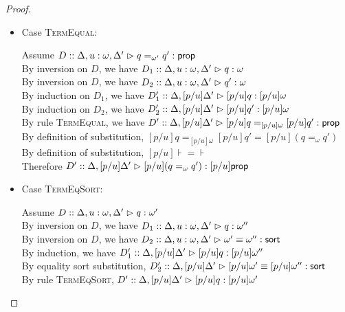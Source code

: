\begin{proof}
\begin{enumerate}
\begin{itemize}
    \item Case \textsc{TermEqual}: 
      \begin{tabbedproof}
        \oo Assume $D :: \judgeA[{\Delta, u:\omega, \Delta'}]{q =_{\omega'} q'}{\assert}$ \\
        \ooo By inversion on $D$, we have 
             $D_1 :: \judgeA[{\Delta, u:\omega, \Delta'}]{q}{\omega}$ \\
        \ooo By inversion on $D$, we have 
             $D_2 :: \judgeA[{\Delta, u:\omega, \Delta'}]{q'}{\omega}$ \\
        \ooo By induction on $D_1$, we have 
             $D'_1 :: \judgeA[{\Delta, [p/u]\Delta'}]{[p/u]q}{[p/u]\omega}$ \\
        \ooo By induction on $D_2$, we have 
             $D'_2 :: \judgeA[{\Delta, [p/u]\Delta'}]{[p/u]q'}{[p/u]\omega}$ \\
        \ooo By rule \textsc{TermEqual}, we have 
             $D' :: \judgeA[{\Delta, [p/u]\Delta'}]{[p/u]q =_{[p/u]\omega} [p/u]q'}{\assert}$ \\
        \ooo By definition of substitution, $[p/u]q =_{[p/u]\omega} [p/u]q' = [p/u](q =_\omega q')$\\
        \ooo By definition of substitution, $[p/u]\assert = \assert$ \\
        \ooo Therefore 
             $D' :: \judgeA[{\Delta, [p/u]\Delta'}]{[p/u](q =_\omega q')}{[p/u]\assert}$ \\
      \end{tabbedproof}

    \item Case \textsc{TermEqSort}:
      \begin{tabbedproof}
        \oo Assume $D :: \judgeA[{\Delta, u:\omega, \Delta'}]{q}{\omega'}$ \\
        \ooo By inversion on $D$, we have 
             $D_1 :: \judgeA[{\Delta, u:\omega, \Delta'}]{q}{\omega''}$ \\
        \ooo By inversion on $D$, we have 
             $D_2 :: \judgeSortEq[{\Delta, u:\omega, \Delta'}]{\omega'}{\omega''}$ \\
        \ooo By induction, we have 
             $D'_1 :: \judgeA[{\Delta, [p/u]\Delta'}]{[p/u]q}{[p/u]\omega''}$ \\
        \ooo By equality sort substitution, 
             $D'_2 :: \judgeSortEq[{\Delta, [p/u]\Delta'}]{[p/u]\omega'}{[p/u]\omega''}$ \\
        \ooo By rule \textsc{TermEqSort}, 
             $D' :: \judgeA[{\Delta, [p/u]\Delta'}]{[p/u]q}{[p/u]\omega'}$ \\
      \end{tabbedproof}


\end{itemize}
\end{enumerate}
\end{proof}
